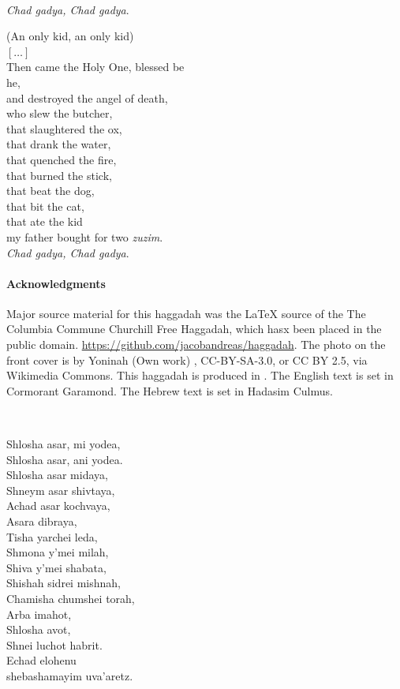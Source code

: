 \documentclass[extrafontsizes,twoside,17pt,a4paper,openany]{memoir}
\newcommand{\HgEllipsis}{\ensuremath{\left[\ldots\right]}}
\newcommand{\cH}{Ch}
\newenvironment{HgEnglish}{\strut\\\noindent}{\vspace{1em}}
\newenvironment{HgTranslit}{\strut\\\noindent\begin{itshape}}{\end{itshape}\vspace{1em}}
\begin{document}
\begin{multicols}{2}
\begin{HgEnglish}
{\itshape {\cH}ad gadya, {\cH}ad gadya}. \\
\strut \hfill (An only kid, an only kid) \\
\HgEllipsis \\
Then came the Holy One, blessed be \\
\vin he, \\
and destroyed the angel of death, \\
who slew the butcher, \\
that slaughtered the ox, \\
that drank the water, \\
that quenched the fire, \\
that burned the stick, \\
that beat the dog, \\
that bit the cat, \\
that ate the kid \\
my father bought for two {\itshape zuzim}. \\
{\itshape {\cH}ad gadya, {\cH}ad gadya}.
\end{HgEnglish}

{\tiny
\paragraph*{Acknowledgments}

\raggedright
Major  source material for this haggadah was the {\LaTeX}
source of the The Columbia Commune Churchill Free Haggadah, which hasx been
  placed in the public domain.
   \url{https://github.com/jacobandreas/haggadah}.
The photo on the
  front cover is by Yoninah (Own work) , CC-BY-SA-3.0, 
  or CC BY 2.5, via Wikimedia
  Commons. This  haggadah is produced in {\XeLaTeX}. The English text is
set in Cormorant Garamond. The Hebrew text is set in Hadasim Culmus.
}

\columnbreak
\begin{HgTranslit}
Shlosha asar, mi yodea, \\
Shlosha asar, ani yodea.\\
Shlosha asar midaya, \\
Shneym asar shivtaya, \\
Achad asar kochvaya, \\
Asara dibraya, \\
Tisha yarchei leda, \\
Shmona y’mei milah,\\
Shiva y’mei shabata, \\
Shishah sidrei mishnah,\\ 
Chamisha chumshei torah,\\ 
Arba imahot,\\ 
Shlosha avot,\\
Shnei luchot habrit. \\
Echad elohenu \\
shebashamayim uva’aretz.
\end{HgTranslit}


\end{multicols}
\end{document}
